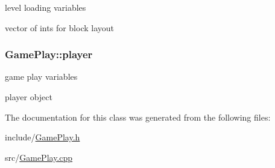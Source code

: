 level loading variables 

vector of ints for block layout \hypertarget{class_game_play_a08dc6e920f9c76ce54be4e5d2095851b}{
\subsubsection[{player}]{ Game\-Play\-::player\hspace{0.3cm}{\ttfamily [protected]}}}\label{class_game_play_a08dc6e920f9c76ce54be4e5d2095851b}


game play variables 

player object 

The documentation for this class was generated from the following files\-:\begin{DoxyCompactItemize}
\item 
include/\hyperlink{_game_play_8h}{Game\-Play.\-h}\item 
src/\hyperlink{_game_play_8cpp}{Game\-Play.\-cpp}\end{DoxyCompactItemize}
